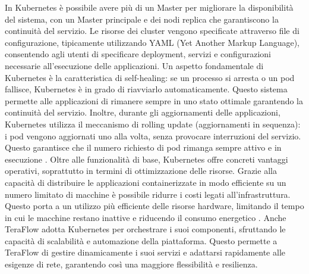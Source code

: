 In Kubernetes è possibile avere più di un Master per migliorare la disponibilità del sistema, con un Master principale e dei nodi replica che garantiscono la continuità del servizio.
Le risorse dei cluster vengono specificate attraverso file di configurazione, tipicamente utilizzando YAML (Yet Another Markup Language), consentendo agli utenti di specificare deployment, servizi e configurazioni necessarie all'esecuzione delle applicazioni.
Un aspetto fondamentale di Kubernetes è la caratteristica di self-healing: se un processo si arresta o un pod fallisce, Kubernetes è in grado di riavviarlo automaticamente. 
Questo sistema permette alle applicazioni di rimanere sempre in uno stato ottimale garantendo la continuità del servizio.
Inoltre, durante gli aggiornamenti delle applicazioni, Kubernetes utilizza il meccanismo di rolling update (aggiornamenti in sequenza): 
i pod vengono aggiornati uno alla volta, senza provocare interruzioni del servizio. Questo garantisce che il numero richiesto di pod rimanga sempre attivo e in esecuzione \cite{kubeart}.
Oltre alle funzionalità di base, Kubernetes offre concreti vantaggi operativi, soprattutto in termini di ottimizzazione delle risorse. 
Grazie alla capacità di distribuire le applicazioni containerizzate in modo efficiente su un numero limitato di macchine è possibile ridurre i costi legati all'infrastruttura. 
Questo porta a un utilizzo più efficiente delle risorse hardware, limitando il tempo in cui le macchine restano inattive e riducendo il consumo energetico \cite{bookub}.
Anche TeraFlow adotta Kubernetes per orchestrare i suoi componenti, sfruttando le capacità di scalabilità e automazione della piattaforma. 
Questo permette a TeraFlow di gestire dinamicamente i suoi servizi e adattarsi rapidamente alle esigenze di rete, garantendo così una maggiore flessibilità e resilienza.


